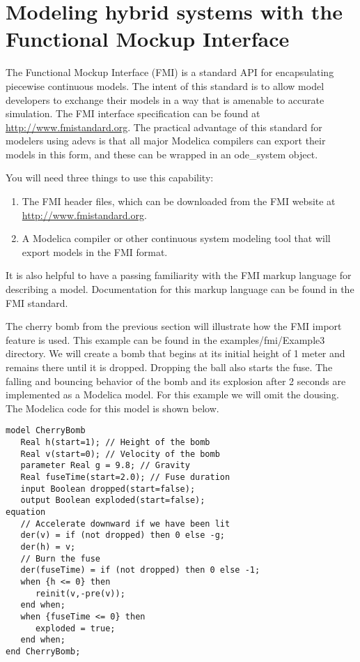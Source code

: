 \section{Modeling hybrid systems with the Functional Mockup Interface}
\label{sect:fmi}
The Functional Mockup Interface (FMI) is a standard API for encapsulating piecewise continuous models. The intent of this standard is to allow model developers to exchange their models in a way that is amenable to accurate simulation. The FMI interface specification can be found at \url{http://www.fmistandard.org}. The practical advantage of this standard for modelers using adevs is that all major Modelica compilers can export their models in this form, and these can be wrapped in an ode\_system object.

You will need three things to use this capability:
\begin{enumerate}
\item The FMI header files, which can be downloaded from the FMI website at \url{http://www.fmistandard.org}.
\item A Modelica compiler or other continuous system modeling tool that will export models in the FMI format.
\end{enumerate}
It is also helpful to have a passing familiarity with the FMI markup language for describing a model. Documentation for this markup language can be found in the FMI standard.

The cherry bomb from the previous section will illustrate how the FMI import feature is used. This example can be found in the examples/fmi/Example3 directory. We will create a bomb that begins at its initial height of 1 meter and remains there until it is dropped. Dropping the ball also starts the fuse. The falling and bouncing behavior of the bomb and its explosion after 2 seconds are implemented as a Modelica model. For this example we will omit the dousing. The Modelica code for this model is shown below.
\begin{verbatim}
model CherryBomb
   Real h(start=1); // Height of the bomb
   Real v(start=0); // Velocity of the bomb
   parameter Real g = 9.8; // Gravity
   Real fuseTime(start=2.0); // Fuse duration
   input Boolean dropped(start=false); 
   output Boolean exploded(start=false);
equation
   // Accelerate downward if we have been lit
   der(v) = if (not dropped) then 0 else -g;
   der(h) = v;
   // Burn the fuse
   der(fuseTime) = if (not dropped) then 0 else -1;
   when {h <= 0} then
      reinit(v,-pre(v));
   end when;
   when {fuseTime <= 0} then
      exploded = true;
   end when;
end CherryBomb;
\end{verbatim}

